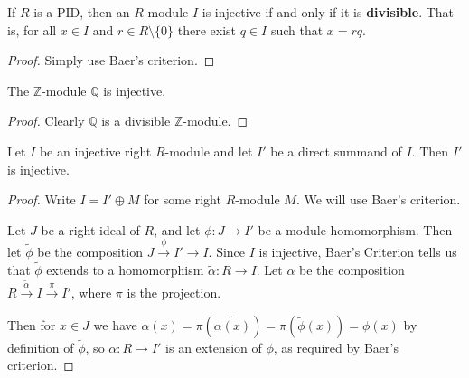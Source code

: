 \begin{corollary}
  If $ R $ is a PID, then an $ R $-module $ I $ is injective if and only if it is \textbf{divisible}. That is, for all $ x \in I $ and $ r \in R \setminus \{0\} $ there exist $ q \in I $ such that $ x = rq $.
\end{corollary}
\begin{proof}
  Simply use Baer's criterion.
\end{proof}

\begin{corollary}
  The $ \mathbb{Z} $-module $ \mathbb{Q} $ is injective.
\end{corollary}
\begin{proof}
  Clearly $ \mathbb{Q} $ is a divisible $ \mathbb{Z} $-module.
\end{proof}

\begin{lemma}
  Let $ I $ be an injective right $ R $-module and let $ I' $ be a direct summand of $ I $. Then $ I' $ is injective.
\end{lemma}
\begin{proof}
  Write $ I = I' \oplus M $ for some right $ R $-module $ M $. We will use Baer's criterion.

  Let $ J $ be a right ideal of $ R $, and let $ \phi: J \to I' $ be a module homomorphism. Then let $ \tilde{\phi} $ be the composition $ J \xrightarrow{\phi} I' \to I $. Since $ I $ is injective, Baer's Criterion tells us that $ \tilde{\phi} $ extends to a homomorphism $ \tilde{\alpha}: R \to I $. Let $ \alpha $ be the composition $ R \xrightarrow{\tilde{\alpha}} I \xrightarrow{\pi} I' $, where $ \pi $ is the projection.

  Then for $ x \in J $ we have $ \alpha(x) = \pi(\tilde{\alpha(x)})=\pi(\tilde{\phi}(x)) = \phi(x) $ by definition of $ \tilde{\phi} $, so $ \alpha: R \to I' $ is an extension of $ \phi $, as required by Baer's criterion.
\end{proof}
